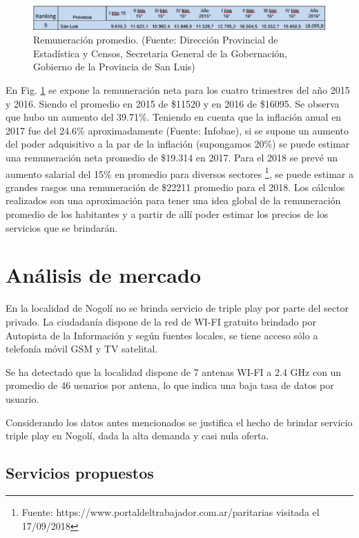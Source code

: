 \documentclass[12pt,a4paper]{book}
\begin{document}
\begin{figure} [H]
\centering
\includegraphics[width= 15cm]{../figuras/4_2_Fig1.jpg}
\caption{Remuneración promedio. (Fuente: Dirección Provincial de Estadística y Censos, Secretaria General de la Gobernación, Gobierno de la Provincia de San Luis)}
\label{fig_rem_prom}
\end{figure}


En Fig. \ref{fig_rem_prom} se expone la remuneración neta para los cuatro trimestres del año 2015 y 2016. Siendo el promedio en 2015 de \$11520 y en 2016 de \$16095. Se observa que hubo un aumento del 39.71\%. Teniendo en cuenta que la inflación anual en 2017 fue del 24.6\% aproximadamente (Fuente: Infobae), si se supone un aumento del poder adquisitivo a la par de la inflación (supongamos 20\%) se puede estimar una remuneración neta promedio de \$19.314 en 2017. Para el 2018 se prevé un aumento salarial del 15\% en promedio para diversos sectores \footnote{Fuente: https://www.portaldeltrabajador.com.ar/paritarias visitada el 17/09/2018}, se puede estimar a grandes rasgos una remuneración de \$22211 promedio para el 2018. Los cálculos realizados son una aproximación para tener una idea global de la remuneración promedio de los habitantes y a partir de allí poder estimar los precios de los servicios que se brindarán.



\chapter{Análisis de mercado} \label{sec_analisis_mercado}

En la localidad de Nogolí no se brinda servicio de triple play por parte del sector privado. La ciudadanía dispone de la red de WI-FI gratuito brindado por Autopista de la Información y según fuentes locales, se tiene acceso sólo a telefonía móvil GSM y TV satelital.

Se ha detectado que la localidad dispone de 7 antenas WI-FI a 2.4 GHz con un promedio de 46 usuarios por antena, lo que indica una baja tasa de datos por usuario.

Considerando los datos antes mencionados se justifica el hecho de brindar servicio triple play en Nogolí, dada la alta demanda y casi nula oferta.

\section{Servicios propuestos}
\end{document}
